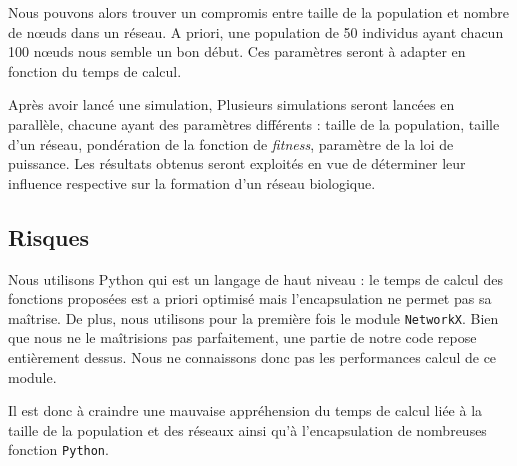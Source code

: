 Nous pouvons alors trouver un compromis entre taille de la population et nombre de nœuds dans un réseau. A priori, une population de 50 individus ayant chacun 100 nœuds nous semble un bon début. Ces paramètres seront à adapter en fonction du temps de calcul.

Après avoir lancé une simulation, Plusieurs simulations seront lancées en parallèle, chacune ayant des paramètres différents : taille de la population, taille d'un réseau, pondération de la fonction de \textit{fitness}, paramètre de la loi de puissance. Les résultats obtenus seront exploités en vue de déterminer leur influence respective sur la formation d'un réseau biologique.

\subsection{Risques}
Nous utilisons Python qui est un langage de haut niveau : le temps de calcul des fonctions proposées est a priori optimisé mais l'encapsulation ne permet pas sa maîtrise. De plus, nous utilisons pour la première fois le module \verb?NetworkX?. Bien que nous ne le ma\^itrisions pas parfaitement, une partie de notre code repose entièrement dessus. Nous ne connaissons donc pas les performances calcul de ce module.

Il est donc à craindre une mauvaise appréhension du temps de calcul liée à la taille de la population et des réseaux ainsi qu'à l'encapsulation de nombreuses fonction \verb?Python?.


